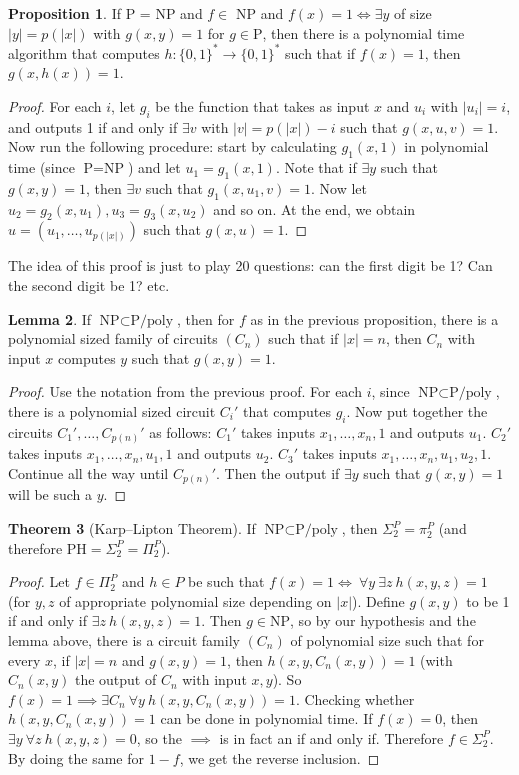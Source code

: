 \documentclass{article}
\theoremstyle{definition}
\newtheorem{theorem}{Theorem}[section]
\newtheorem{lemma}[theorem]{Lemma}
\newtheorem{prop}[theorem]{Proposition}
\begin{document}
\begin{prop}
    If P = NP and $f \in $ NP and $f(x)=1 \iff \exists y$ of size $\left|y \right|=p(\left|x \right|)$ with $g(x,y)=1$ for $g \in \text{P}$, then there is a polynomial time algorithm that computes $h : \{0,1\}^* \to \{0,1\}^*$ such that if $f(x)=1$, then $g(x,h(x))=1$.
\end{prop}
\begin{proof}
    For each $i$, let $g_i$ be the function that takes as input $x$ and $u_i$ with $\left|u_i \right|=i$, and outputs 1 if and only if $\exists v$ with $\left|v \right|=p(\left|x \right|)-i$ such that $g(x,u,v)=1$. Now run the following procedure: start by calculating $g_1(x,1)$ in polynomial time (since $\text{P}=\text{NP}$) and let $u_1=g_1(x,1)$. Note that if $\exists y$ such that $g(x,y)=1$, then $\exists v$ such that $g_1(x,u_1,v)=1$. Now let $u_2 = g_2(x, u_1), u_3=g_3(x,u_2)$ and so on. At the end, we obtain $u = (u_1,\ldots,u_{p(\left|x \right|)})$ such that $g(x,u)=1$.
\end{proof}
The idea of this proof is just to play 20 questions: can the first digit be 1? Can the second digit be 1? etc.
\begin{lemma}
    If $\text{NP}\subset \text{P/poly}$, then for $f$ as in the previous proposition, there is a polynomial sized family of circuits $(C_n)$ such that if $\left|x \right|=n$, then $C_n$ with input $x$ computes $y$ such that $g(x,y)=1$. 
\end{lemma}
\begin{proof}
    Use the notation from the previous proof. For each $i$, since $\text{NP}\subset \text{P/poly}$, there is a polynomial sized circuit $C_i'$ that computes $g_i$. Now put together the circuits $C_1',\ldots,C_{p(n)}'$ as follows: $C_1'$ takes inputs $x_1,\ldots,x_n,1$ and outputs $u_1$. $C_2'$ takes inputs $x_1,\ldots,x_n,u_1,1$ and outputs $u_2$. $C_3'$ takes inputs $x_1,\ldots,x_n,u_1,u_2,1$. Continue all the way until $C_{p(n)}'$. Then the output if $\exists y$ such that $g(x,y)=1$ will be such a $y$.
\end{proof}
\begin{theorem}[Karp--Lipton Theorem]
    If $\text{NP}\subset \text{P/poly}$, then $\Sigma_2^P = \pi_2^P$ (and therefore $\text{PH} = \Sigma_2^P = \Pi_2^P$).
\end{theorem}
\begin{proof}
    Let $f \in \Pi_2^P$ and $h \in P$ be such that $f(x)=1 \iff ~\forall y ~\exists z ~ {h(x,y,z)=1}$ (for $y,z$ of appropriate polynomial size depending on $\left|x\right|$). Define $g(x,y)$ to be 1 if and only if $\exists z ~h(x,y,z)=1$. Then $g \in \text{NP}$, so by our hypothesis and the lemma above, there is a circuit family $(C_n)$ of polynomial size such that for every $x$, if $\left|x\right|=n$ and $g(x,y)=1$, then $h(x,y,C_n(x,y)) = 1$ (with $C_n(x,y)$ the output of $C_n$ with input $x,y$). So $f(x)=1 \implies \exists C_n ~\forall y ~ h(x,y, C_n(x,y))=1$. Checking whether $h(x,y, C_n(x,y))=1$ can be done in polynomial time. If $f(x)=0$, then $\exists y ~\forall z ~h(x,y,z)=0$, so the $\implies$ is in fact an if and only if. Therefore $f \in \Sigma_2^P$. By doing the same for $1-f$, we get the reverse inclusion.
\end{proof}
\end{document}
